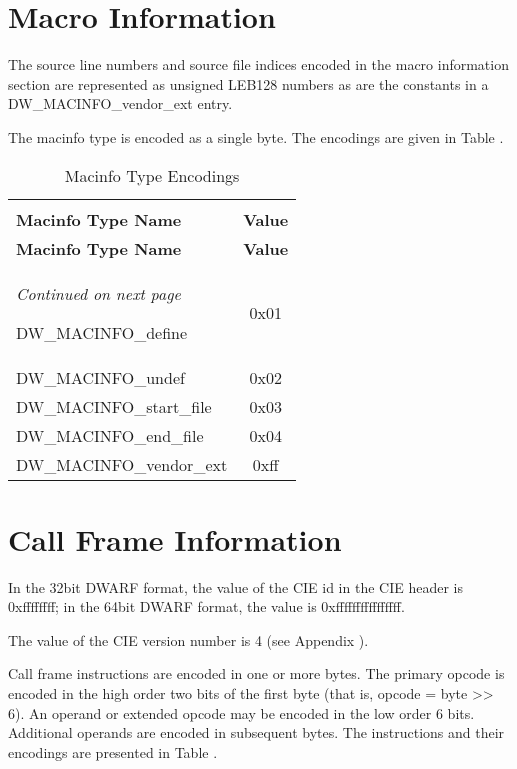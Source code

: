 \section{Macro Information}
\label{datarep:macroinformation}

The source line numbers and source file indices encoded in the
macro information section are represented as unsigned LEB128
numbers as are the constants in a DW\-\_MACINFO\-\_vendor\-\_ext entry.

The macinfo type is encoded as a single byte. 
The encodings are given in 
Table .


\begin{centering}
\setlength{\extrarowheight}{0.1cm}
\begin{longtable}{l|c}
  \caption{Macinfo Type Encodings} \label{tab:macinfotypeencodings}\\
  \hline \\ \bfseries Macinfo Type Name&\bfseries Value \\ \hline
\endfirsthead
  \bfseries Macinfo Type Name&\bfseries Value\\ \hline
\endhead
  \hline \emph{Continued on next page}
\endfoot
  \hline
\endlastfoot

DW\-\_MACINFO\-\_define&0x01 \\
DW\-\_MACINFO\-\_undef&0x02 \\
DW\-\_MACINFO\-\_start\-\_file&0x03 \\
DW\-\_MACINFO\-\_end\-\_file&0x04 \\
DW\-\_MACINFO\-\_vendor\-\_ext&0xff \\

\end{longtable}
\end{centering}

\section{Call Frame Information}
\label{datarep:callframeinformation}

In the 32\dash bit DWARF format, the value of the CIE id in the
CIE header is 0xffffffff; in the 64\dash bit DWARF format, the
value is 0xffffffffffffffff.

The value of the CIE version number is 4 
(see Appendix ). 

Call frame instructions are encoded in one or more bytes. The
primary opcode is encoded in the high order two bits of
the first byte (that is, opcode = byte >> 6). An operand
or extended opcode may be encoded in the low order 6
bits. Additional operands are encoded in subsequent bytes.
The instructions and their encodings are presented in
Table .

